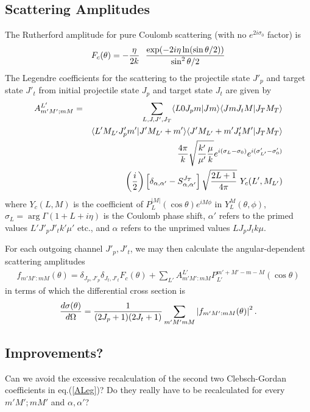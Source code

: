 \documentclass[11pt,a4paper]{article}
\begin{document}
\subsection*{Scattering Amplitudes}

The Rutherford amplitude for pure Coulomb scattering
(with no $ e^{2i \sigma_0} $ factor) is
\begin{eqnarray} \label{ruther}
F_c ( \theta ) = - {\eta \over 2k} ~~
               { \exp (-2 i \eta \ln(\sin \theta /2))  \over  \sin^2 \theta /2}
\end{eqnarray}
The Legendre coefficients for the scattering to the projectile state
$ J'_ p $ and target state $ J'_ t $
from initial projectile state $ J_p $
and target state $ J_t $ are given by
\begin{eqnarray}  \nonumber
 A^{L'}_{m' M' ;mM} &=&
   \sum_{L,J,J' ,J_T }
    \langle L0 J_p m | Jm\rangle\langle Jm J_t M |J_T M_T\rangle \\
&& \langle L' M_{L'} J'_ p m' | J' M_{L'} + m'\rangle
    \langle J' M_{L'}  +m' J'_ t M' |J_T M_T\rangle \nonumber\\
&&  \nonumber
  {4 \pi \over k} \sqrt {\frac{k'}{\mu'}\frac{\mu}{k}}
    e^{i( \sigma_L - \sigma_0 )}
      e^{i( \sigma'_ {L'} - \sigma'_ 0 )}\\
&&  \label{ALeg}
  \left ( {i \over 2} \right )
      \left [ \delta_{\alpha ,\alpha'} - S^{J_T}_{\alpha ,\alpha'} \right ]
    \sqrt {{2L+1 \over {4 \pi}}}~ Y_c (L' ,M_{L'})
\end{eqnarray}
where $Y_c (L,M)$ is the coefficient of
$P_L^{|M|} (\cos \theta )
    e^{iM\phi}$ in $Y_L^M (\theta ,\phi )$,
$  \sigma_L = \arg \Gamma (1 + L + i \eta )$ is the Coulomb phase shift,
$\alpha'$ refers to the primed values
$ L'  J'_ p J'_ t  k' \mu' $ etc.,
and $\alpha$ refers to the unprimed values
$ L J_p J_t k \mu $.

For each outgoing channel $J'_ p , J'_ t $,
we may then calculate the angular-dependent scattering amplitudes
\begin{eqnarray}
f_{m' M' : mM} (\theta) =
    \delta_{J_p , J'_ p}
    \delta_{J_t , J'_ t}
     F_c (\theta) +
  \sum_{L'} A_{m' M' : mM}^{L'}
                    P_{L'}^{m' +M' -m-M} (\cos \theta)
\end{eqnarray}
in terms of which the differential cross section is
\begin{eqnarray}
  {d \sigma(\theta) \over d \Omega} =
   {1 \over (2J_p + 1)(2J_t + 1) }
   \sum_{m' M' m M}
           \left | f_{m' M' : mM} (\theta) \right | ^2 .
\end{eqnarray}


\subsection*{Improvements?}
Can we avoid the excessive recalculation of the second two Clebsch-Gordan coefficients in eq.(\ref{ALeg})?
Do they really have to be recalculated for every $m' M' ;mM'$ and $\alpha,\alpha'$?
\end{document}
